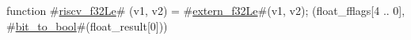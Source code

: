 function #\hyperref[sailRISCVzriscvzyf32Le]{riscv\_f32Le}# (v1, v2) = {
  #\hyperref[sailRISCVzexternzyf32Le]{extern\_f32Le}#(v1, v2);
  (float_fflags[4 .. 0], #\hyperref[sailRISCVzbitzytozybool]{bit\_to\_bool}#(float_result[0]))
}
